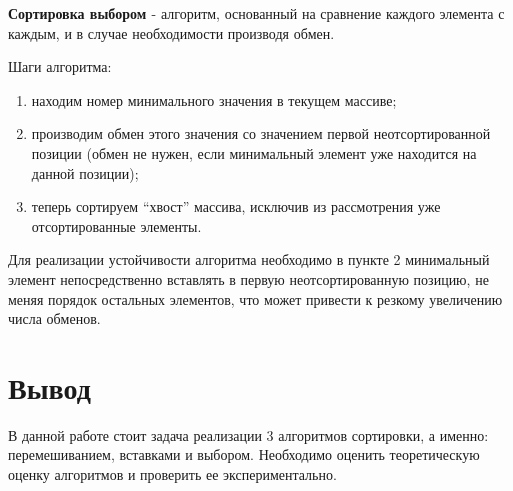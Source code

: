 \textbf{Сортировка выбором \cite{select}} - алгоритм, основанный на сравнение каждого элемента с каждым, и в случае необходимости производя обмен.

Шаги алгоритма:
\begin{enumerate}
	\item находим номер минимального значения в текущем массиве;
	\item производим обмен этого значения со значением первой неотсортированной позиции (обмен не нужен, если минимальный элемент уже находится на данной позиции);
	\item теперь сортируем ``хвост'' массива, исключив из рассмотрения уже отсортированные элементы.
\end{enumerate}

Для реализации устойчивости алгоритма необходимо в пункте 2 минимальный элемент непосредственно вставлять в первую неотсортированную позицию, не меняя порядок остальных элементов, что может привести к резкому увеличению числа обменов. 


\section*{Вывод}

В данной работе стоит задача реализации 3 алгоритмов сортировки, а
именно: перемешиванием, вставками и выбором. Необходимо оценить теоретическую оценку алгоритмов и проверить ее экспериментально.




